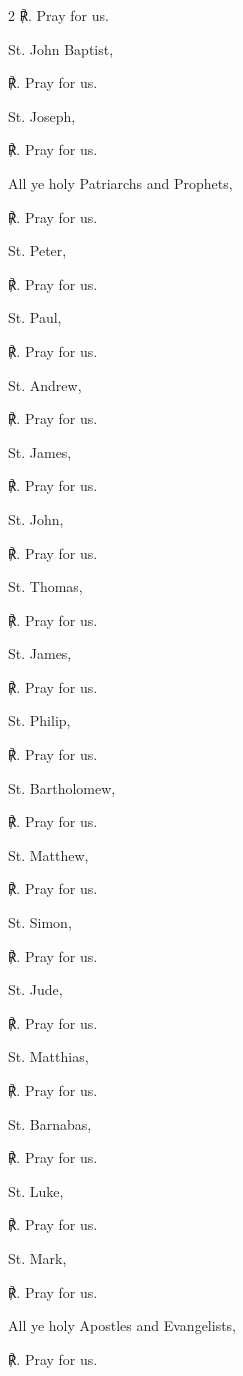\begin{multicols}{2}
℟. Pray for us.\par\noindent
St. John Baptist,\par
℟. Pray for us.\par\noindent
St. Joseph,\par
℟. Pray for us.\par\noindent
All ye holy Patriarchs and Prophets,\par
℟. Pray for us.\par\noindent
St. Peter,\par
℟. Pray for us.\par\noindent
St. Paul,\par
℟. Pray for us.\par\noindent
St. Andrew,\par
℟. Pray for us.\par\noindent
St. James,\par
℟. Pray for us.\par\noindent
St. John,\par
℟. Pray for us.\par\noindent
St. Thomas,\par
℟. Pray for us.\par\noindent
St. James,\par
℟. Pray for us.\par\noindent
St. Philip,\par
℟. Pray for us.\par\noindent
St. Bartholomew,\par
℟. Pray for us.\par\noindent
St. Matthew,\par
℟. Pray for us.\par\noindent
St. Simon,\par
℟. Pray for us.\par\noindent
St. Jude,\par
℟. Pray for us.\par\noindent
St. Matthias,\par
℟. Pray for us.\par\noindent
St. Barnabas,\par
℟. Pray for us.\par\noindent
St. Luke,\par
℟. Pray for us.\par\noindent
St. Mark,\par
℟. Pray for us.\par\noindent
All ye holy Apostles and Evangelists,\par
℟. Pray for us.\par\noindent

\end{multicols}
